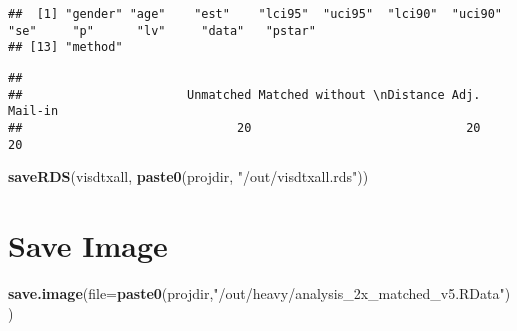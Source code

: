 \documentclass[
]{article}
\newenvironment{Shaded}{\begin{snugshade}}{\end{snugshade}}
\newcommand{\DataTypeTok}[1]{\textcolor[rgb]{0.13,0.29,0.53}{#1}}
\newcommand{\KeywordTok}[1]{\textcolor[rgb]{0.13,0.29,0.53}{\textbf{#1}}}
\newcommand{\NormalTok}[1]{#1}
\newcommand{\OperatorTok}[1]{\textcolor[rgb]{0.81,0.36,0.00}{\textbf{#1}}}
\newcommand{\StringTok}[1]{\textcolor[rgb]{0.31,0.60,0.02}{#1}}
\begin{document}
\begin{verbatim}
##  [1] "gender" "age"    "est"    "lci95"  "uci95"  "lci90"  "uci90"  "se"     "p"      "lv"     "data"   "pstar" 
## [13] "method"
\end{verbatim}

\begin{Shaded}
\end{Shaded}

\begin{verbatim}
## 
##                       Unmatched Matched without \nDistance Adj.                         Mail-in 
##                              20                              20                              20
\end{verbatim}

\begin{Shaded}
\begin{Highlighting}[]
\KeywordTok{saveRDS}\NormalTok{(visdtxall, }\KeywordTok{paste0}\NormalTok{(projdir, }\StringTok{"/out/visdtxall.rds"}\NormalTok{))}
\end{Highlighting}
\end{Shaded}

\hypertarget{save-image}{%
\section{Save Image}\label{save-image}}

\begin{Shaded}
\begin{Highlighting}[]
\KeywordTok{save.image}\NormalTok{(}\DataTypeTok{file=}\KeywordTok{paste0}\NormalTok{(projdir,}\StringTok{"/out/heavy/analysis_2x_matched_v5.RData"}\NormalTok{))}
\end{Highlighting}
\end{Shaded}
\end{document}
